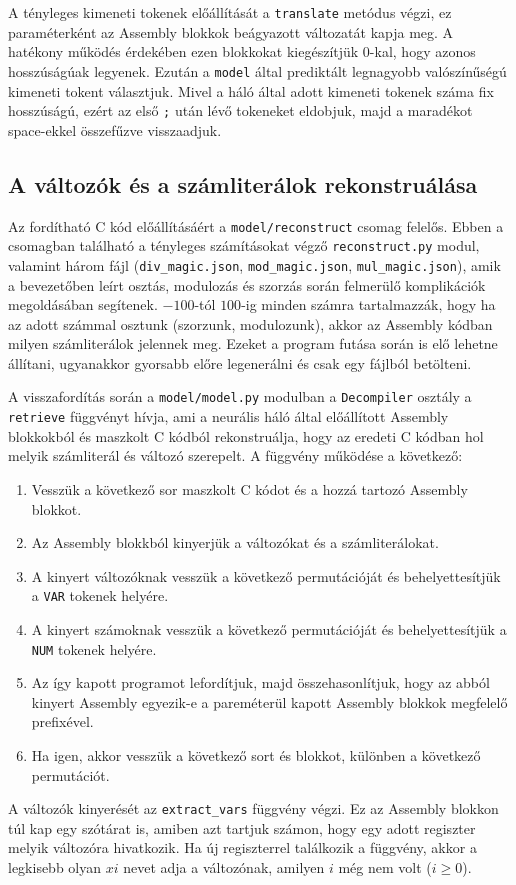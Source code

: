 A tényleges kimeneti tokenek előállítását a \texttt{translate} metódus végzi, ez paraméterként az Assembly
blokkok beágyazott változatát kapja meg. A hatékony működés érdekében ezen blokkokat kiegészítjük $0$-kal, hogy
azonos hosszúságúak legyenek. Ezután a \texttt{model} által prediktált legnagyobb valószínűségú kimeneti tokent
választjuk. Mivel a háló által adott kimeneti tokenek száma fix hosszúságú, ezért az első \texttt{;} után
lévő tokeneket eldobjuk, majd a maradékot space-ekkel összefűzve visszaadjuk.

\subsection{A változók és a számliterálok rekonstruálása}
Az fordítható C kód előállításáért a \texttt{model/reconstruct} csomag felelős. Ebben a csomagban található
a tényleges számításokat végző \texttt{reconstruct.py} modul, valamint három fájl (\texttt{div\_magic.json},
\texttt{mod\_magic.json}, \texttt{mul\_magic.json}), amik a bevezetőben leírt osztás, modulozás és szorzás
során felmerülő komplikációk megoldásában segítenek. $-100$-tól $100$-ig minden számra tartalmazzák, hogy
ha az adott számmal osztunk (szorzunk, modulozunk), akkor az Assembly kódban milyen számliterálok jelennek meg.
Ezeket a program futása során is elő lehetne állítani, ugyanakkor gyorsabb előre legenerálni és csak egy fájlból
betölteni.

A visszafordítás során a \texttt{model/model.py} modulban a \texttt{Decompiler} osztály a \texttt{retrieve}
függvényt hívja, ami a neurális háló által előállított Assembly blokkokból és maszkolt C kódból rekonstruálja,
hogy az eredeti C kódban hol melyik számliterál és változó szerepelt. A függvény működése a következő:
\begin{enumerate}
    \item Vesszük a következő sor maszkolt C kódot és a hozzá tartozó Assembly blokkot.
    \item Az Assembly blokkból kinyerjük a változókat és a számliterálokat.
    \item A kinyert változóknak vesszük a következő permutációját és behelyettesítjük a \texttt{VAR} tokenek helyére.
    \item A kinyert számoknak vesszük a következő permutációját és behelyettesítjük a \texttt{NUM} tokenek helyére.
    \item Az így kapott programot lefordítjuk, majd összehasonlítjuk, hogy az abból kinyert Assembly egyezik-e
          a pareméterül kapott Assembly blokkok megfelelő prefixével.
    \item Ha igen, akkor vesszük a következő sort és blokkot, különben a következő permutációt.
\end{enumerate}
A változók kinyerését az \texttt{extract\_vars} függvény végzi. Ez az Assembly blokkon túl kap egy szótárat is,
amiben azt tartjuk számon, hogy egy adott regiszter melyik változóra hivatkozik. Ha új regiszterrel találkozik
a függvény, akkor a legkisebb olyan $xi$ nevet adja a változónak, amilyen $i$ még nem volt ($i\ge0$).

